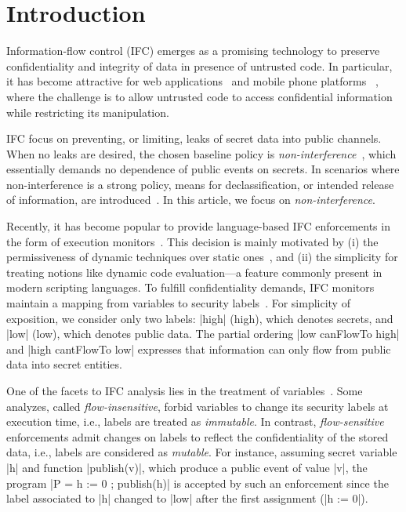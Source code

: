 \section{Introduction}
\label{sec:intro}

Information-flow control (IFC) emerges as a promising technology to preserve
confidentiality and integrity of data in presence of untrusted code.  In
particular, it has become attractive for web 
applications~\citep[e.g.][]{DeGroef:2012:FWB:2382196.2382275, giffin:hails,
  yang:2013:towards, conf/esorics/AkhaweLHSS13, Hedin13} and mobile phone
platforms ~\citep[e.g.][]{Enck:2010,android:esorics13}, where the challenge is
to allow untrusted code to access confidential information while restricting its
manipulation.

IFC focus on preventing, or limiting, leaks of secret data into public
channels. When no leaks are desired, the chosen baseline policy is
\emph{non-interference}~\citep{Goguen:Meseguer:Noninterference}, which 
essentially demands no dependence of public events on secrets. In scenarios where
non-interference is a strong policy, means for declassification, or intended
release of information, are introduced~\citep{Sabelfeld:Sands:CSFW05}. In this
article, we focus on \emph{non-interference}. 

Recently, it has become popular to provide language-based IFC enforcements in
the form of execution monitors~\citep{Hedin2011}. This decision is mainly
motivated by (i) the permissiveness of dynamic techniques over static
ones~\citep{Sabelfeld:Russo:PSI09}, and (ii) the simplicity for treating notions
like dynamic code evaluation---a feature commonly present in modern scripting
languages. To fulfill confidentiality demands, IFC monitors maintain a
mapping from variables to security labels~\citep{myers:dlm,Stefan:2011}.  For
simplicity of exposition, we consider only two labels: |high| (high), which
denotes secrets, and |low| (low), which denotes public data. The partial ordering
|low canFlowTo high| and |high cantFlowTo low| expresses that information
can only flow from public data into secret entities.

One of the facets to IFC analysis lies in the treatment of
variables~\citep{Hunt:2006}. Some analyzes, called
\emph{flow-insensitive}, forbid variables to change its security
labels at execution time, i.e., labels are treated as
\emph{immutable}. In contrast, \emph{flow-sensitive} enforcements
admit changes on labels to reflect the confidentiality of the stored
data, i.e., labels are considered as \emph{mutable}. For instance,
assuming secret variable |h| and function |publish(v)|, which produce
a public event of value |v|, the program |P = h := 0 ; publish(h)| is
accepted by such an enforcement since the label associated to |h|
changed to |low| after the first assignment (|h := 0|).

